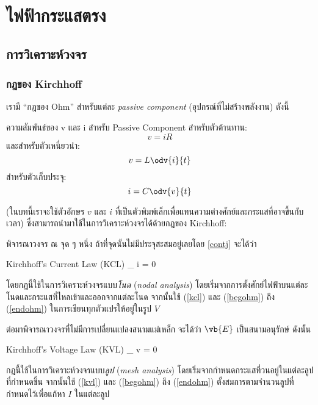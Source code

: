 \chapter{ไฟฟ้ากระแสตรง}
\section{การวิเคราะห์วงจร}

\subsection{กฎของ Kirchhoff}

เรามี ``กฎของ Ohm'' สำหรับแต่ละ \emph{passive component} (อุปกรณ์ที่ไม่สร้างพลังงาน) ดังนี้
\begin{lawbox}{ความสัมพันธ์ของ v และ i สำหรับ Passive Component}
    สำหรับตัวต้านทาน:
    \begin{equation}
        v = iR
    \end{equation}
    และสำหรับตัวเหนี่ยวนำ:
    \begin{equation}
        v = L\odv{i}{t} \label{endohm}
    \end{equation}
    สำหรับตัวเก็บประจุ:
    \begin{equation}
        i = C\odv{v}{t} \label{begohm}
    \end{equation}
\end{lawbox}
(ในบทนี้เราจะใช้ตัวอักษร $v$ และ $i$ ที่เป็นตัวพิมพ์เล็กเพื่อแทนความต่างศักย์และกระแสที่อาจขึ้นกับเวลา) ซึ่งสามารถนำมาใช้ในการวิเคราะห์วงจรได้ด้วยกฎของ Kirchhoff:

พิจารณาวงจร ณ จุด ๆ หนึ่ง ถ้าที่จุดนั้นไม่มีประจุสะสมอยู่เลยโดย \ref{contj} จะได้ว่า
\begin{ieqbox}{Kirchhoff's Current Law (KCL)}
    \sum_ i = 0\label{kcl}
\end{ieqbox}

โดยกฎนี้ใช้ในการวิเคราะห์วงจรแบบ\emph{โนด} (\emph{nodal analysis}) โดยเริ่มจากการตั้งศักย์ไฟฟ้าบนแต่ละโนดและกระแสที่ไหลเข้าและออกจากแต่ละโนด จากนั้นใช้ (\ref{kcl}) และ (\ref{begohm}) ถึง (\ref{endohm}) ในการเขียนทุกตัวแปรให้อยู่ในรูป $V$

ต่อมาพิจารณาวงจรที่ไม่มีการเปลี่ยนแปลงสนามแม่เหล็ก จะได้ว่า $\vb{E}$ เป็นสนามอนุรักษ์ ดังนั้น
\begin{ieqbox}{Kirchhoff's Voltage Law (KVL)}
    \sum_ v = 0\label{kvl}
\end{ieqbox}

กฎนี้ใช้ในการวิเคราะห์วงจรแบบ\emph{ลูป} (\emph{mesh analysis}) โดยเริ่มจากกำหนดกระแสที่วนอยู่ในแต่ละลูปที่กำหนดขึ้น จากนั้นใช้ (\ref{kvl}) และ (\ref{begohm}) ถึง (\ref{endohm}) ตั้งสมการตามจำนวนลูปที่กำหนดไว้เพื่อแก้หา $I$ ในแต่ละลูป

